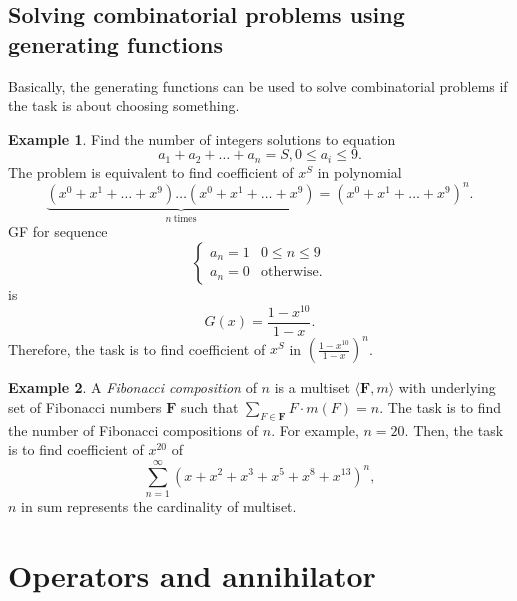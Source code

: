\documentclass[a4paper]{article}
\theoremstyle{definition}
\newtheorem{example}{Example}[section]
\begin{document}
\subsection{Solving combinatorial problems using generating functions}

Basically, the generating functions can be used to solve combinatorial
problems if the task is about choosing something.

\begin{example}
  Find the number of integers solutions to equation
  \[
    a_1 + a_2 + \ldots + a_n = S, 0 \le a_i \le 9
  .\]
  The problem is equivalent to find coefficient of \(x^S\)
  in polynomial
   \[
     \underbrace{(x^0 + x^1 + \ldots + x^9) \ldots (x^0 + x^1 + \ldots +
     x^9)}_{n\ \text{times}} = (x^0  + x^1 + \ldots + x^9)^n
  .\]
  GF for sequence
  \[
    \begin{cases}
      a_n = 1 & 0 \le n \le 9 \\
      a_n = 0 & \text{otherwise}.
    \end{cases}
  \]
  is
  \[
    G(x) = \frac{1 - x^{10}}{1 - x}
  .\]
  Therefore, the task is to find coefficient of \(x^S\)
  in \(\left( \frac{1 - x^{10}}{1 - x} \right)^n \).
\end{example}

\newcommand\FBS{\boldsymbol{F}}
\begin{example}
  A \textit{Fibonacci composition} of \(n\) is a multiset \(\langle \FBS, m
  \rangle\) with underlying set of Fibonacci numbers \(\FBS\)
  such that \(\sum_{F \in \FBS} F \cdot m(F) = n\).
  The task is to find the number of Fibonacci compositions of \(n\).
  For example, \(n = 20\).
  Then, the task is to find coefficient of  \(x^{20}\) of
  \[
     \sum_{n = 1}^{\infty} (x + x^2 + x^3 + x^5 + x^8 + x^{13})^n,
  \]
  \(n\) in sum represents the cardinality of multiset.
\end{example}

\section{Operators and annihilator}
\end{document}
